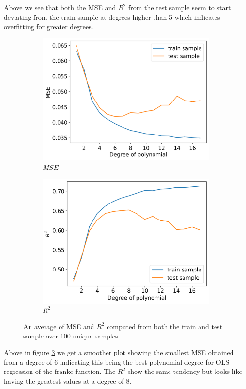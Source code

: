 \documentclass[12pt]{article}
\begin{document}
Above we see that both the MSE and $R^2$ from the test sample seem to start deviating from the train sample at degrees higher than 5 which indicates overfitting for greater degrees.
\begin{figure}[H]
  \begin{subfigure}{.5\textwidth}
    \centering
    \includegraphics[width=\textwidth]{../figures/MSE_train_test_resample.png}
    \caption{$MSE$}
    \label{fig:train_test_resample_mse}
  \end{subfigure}
  \begin{subfigure}{.5\textwidth}
    \centering
    \includegraphics[width=\textwidth]{../figures/R2_train_test_resample.png}
    \caption{$R^2$}
    \label{fig:train_test_resample_r2}
  \end{subfigure}
  \caption{An average of MSE and $R^2$ computed from both the train and test sample over 100 unique samples}
  \label{fig:train_test_resample}
\end{figure}
Above in figure \ref{fig:train_test_resample} we get a smoother plot showing the smallest MSE obtained from a degree of 6 indicating this being the best polynomial degree for OLS regression of the franke function. The $R^2$ show the same tendency but looks like having the greatest values at a degree of 8.
\end{document}
